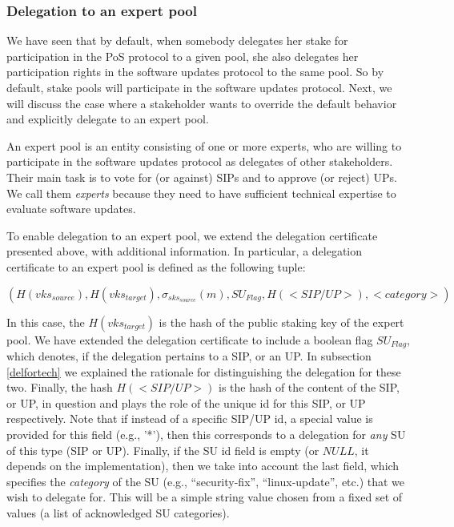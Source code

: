 \documentclass[11pt,a4paper]{article}
\begin{document}
\subsubsection{Delegation to an expert pool}
\label{sec:delegation-an-expert}

We have seen that by default, when somebody delegates her stake for
participation in the PoS protocol to a given pool, she also delegates her
participation rights in the software updates protocol to the same pool.
%
So by default, stake pools will participate in the software updates protocol.
Next, we will discuss the case where a stakeholder wants to override the default
behavior and explicitly delegate to an expert pool.

An expert pool is an entity consisting of one or more experts, who are willing
to participate in the software updates protocol as delegates of other
stakeholders. Their main task is to vote for (or against) SIPs and to approve
(or reject) UPs. We call them \emph{experts} because they need to have
sufficient technical expertise to evaluate software updates.

To enable delegation to an expert pool, we extend the delegation certificate
presented above, with additional information. In particular, a delegation
certificate to an expert pool is defined as the following tuple:

$$
(H(vks_{source}),
 H(vks_{target}),
 \sigma_{sks_{source}}(m),
 SU_{Flag},
 H(<SIP/UP>),
 <category>)
$$

In this case, the $H(vks_{target})$ is the hash of the public staking key of the
expert pool. We have extended the delegation certificate to include a boolean
flag $SU_{Flag}$, which denotes, if the delegation pertains to a SIP, or an UP.
In subsection \ref{delfortech} we explained the rationale
for distinguishing the delegation for these two. Finally, the hash $H(<SIP/UP>)$
is the hash of the content of the SIP, or UP, in question and plays the role of
the unique id for this SIP, or UP respectively. Note that if instead of a
specific SIP/UP id, a special value is provided for this field (e.g., '*'), then
this corresponds to a delegation for \emph{any} SU of this type (SIP or UP).
Finally, if the SU id field is empty (or $NULL$, it depends on the
implementation), then we take into account the last field, which specifies the
\emph{category} of the SU (e.g., ``security-fix'', ``linux-update'', etc.)
that we wish to delegate for. This will be a simple string value chosen from a
fixed set of values (a list of acknowledged SU categories).
\end{document}

